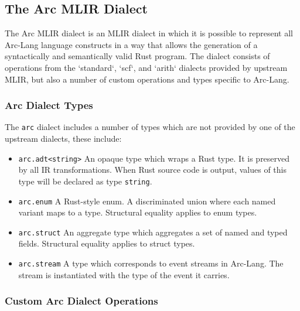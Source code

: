\subsection{The Arc MLIR Dialect}

The Arc MLIR dialect is an MLIR dialect in which it is possible to represent all Arc-Lang language constructs in a way that allows the generation of a syntactically and semantically valid Rust program. The dialect consists of operations from the `standard`, `scf`, and `arith` dialects provided by upstream MLIR, but also a number of custom operations and types specific to Arc-Lang.

\subsubsection{Arc Dialect Types}

The \texttt{arc} dialect includes a number of types which are not provided by one of the upstream dialects, these include:
\begin{itemize}
  \item \texttt{arc.adt<string>} An opaque type which wraps a Rust type. It is preserved by all IR transformations. When Rust source code is output, values of this type will be declared as type \texttt{string}.
  \item \texttt{arc.enum} A Rust-style enum. A discriminated union where each named variant maps to a type. Structural equality applies to enum types.
  \item \texttt{arc.struct} An aggregate type which aggregates a set of named and typed fields. Structural equality applies to struct types.
  \item \texttt{arc.stream} A type which corresponds to event streams in Arc-Lang. The stream is instantiated with the type of the event it carries.
\end{itemize}

\subsubsection{Custom Arc Dialect Operations}

